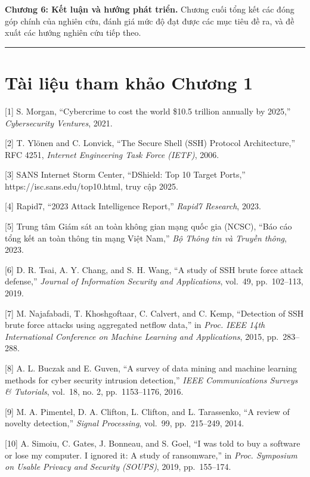 \documentclass[
  a4paper]{report}
\begin{document}
\textbf{Chương 6: Kết luận và hướng phát triển.} Chương cuối tổng kết
các đóng góp chính của nghiên cứu, đánh giá mức độ đạt được các mục tiêu
đề ra, và đề xuất các hướng nghiên cứu tiếp theo.

\begin{center}\rule{0.5\linewidth}{0.5pt}\end{center}

\section{Tài liệu tham khảo Chương
1}\label{tuxe0i-liux1ec7u-tham-khux1ea3o-chux1b0ux1a1ng-1}

{[}1{]} S. Morgan, ``Cybercrime to cost the world \$10.5 trillion
annually by 2025,'' \emph{Cybersecurity Ventures}, 2021.

{[}2{]} T. Ylönen and C. Lonvick, ``The Secure Shell (SSH) Protocol
Architecture,'' RFC 4251, \emph{Internet Engineering Task Force (IETF)},
2006.

{[}3{]} SANS Internet Storm Center, ``DShield: Top 10 Target Ports,''
https://isc.sans.edu/top10.html, truy cập 2025.

{[}4{]} Rapid7, ``2023 Attack Intelligence Report,'' \emph{Rapid7
Research}, 2023.

{[}5{]} Trung tâm Giám sát an toàn không gian mạng quốc gia (NCSC),
``Báo cáo tổng kết an toàn thông tin mạng Việt Nam,'' \emph{Bộ Thông tin
và Truyền thông}, 2023.

{[}6{]} D. R. Tsai, A. Y. Chang, and S. H. Wang, ``A study of SSH brute
force attack defense,'' \emph{Journal of Information Security and
Applications}, vol.~49, pp.~102--113, 2019.

{[}7{]} M. Najafabadi, T. Khoshgoftaar, C. Calvert, and C. Kemp,
``Detection of SSH brute force attacks using aggregated netflow data,''
in \emph{Proc. IEEE 14th International Conference on Machine Learning
and Applications}, 2015, pp.~283--288.

{[}8{]} A. L. Buczak and E. Guven, ``A survey of data mining and machine
learning methods for cyber security intrusion detection,'' \emph{IEEE
Communications Surveys \& Tutorials}, vol.~18, no. 2, pp.~1153--1176,
2016.

{[}9{]} M. A. Pimentel, D. A. Clifton, L. Clifton, and L. Tarassenko,
``A review of novelty detection,'' \emph{Signal Processing}, vol.~99,
pp.~215--249, 2014.

{[}10{]} A. Simoiu, C. Gates, J. Bonneau, and S. Goel, ``I was told to
buy a software or lose my computer. I ignored it: A study of
ransomware,'' in \emph{Proc. Symposium on Usable Privacy and Security
(SOUPS)}, 2019, pp.~155--174.
\end{document}
